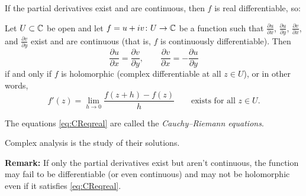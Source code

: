 \documentclass[10pt,aspectratio=169]{beamer}
\begin{document}
\begin{frame}

If the partial derivatives exist and are continuous, then $f$ is real
differentiable, so:

\pause

\begin{corollary}
Let $U \subset {\mathbb{C}}$ be open and let $f = u+iv \colon U \to {\mathbb{C}}$ be a function
such that $\frac{\partial u}{\partial x}$, $\frac{\partial u}{\partial y}$, $\frac{\partial
v}{\partial x}$, and $\frac{\partial v}{\partial y}$ exist and are continuous (that is,
$f$ is continuously differentiable).
\pause
Then
\begin{equation} \label{eq:CReqreal}
\frac{\partial u}{\partial x} = \frac{\partial v}{\partial y} , \qquad
\frac{\partial v}{\partial x} = -\frac{\partial u}{\partial y}
\end{equation}
if and only if $f$ is holomorphic (complex differentiable at all $z \in U$),
\pause
or in other words,
\begin{equation*}
f'(z) =
\lim_{h \to 0} \frac{f(z+h) - f(z)}{h}
\qquad
\text{exists for all $z \in U$.}
\end{equation*}
\end{corollary}

\pause

The equations \eqref{eq:CReqreal} are called the
\emph{Cauchy--Riemann equations}.

\medskip
\pause

Complex analysis is the study of their solutions.

\medskip
\pause

\textbf{Remark:} If only the partial derivatives exist but aren't
continuous, the function may fail to be differentiable (or even continuous)
and may not be holomorphic even if it satisfies
\eqref{eq:CReqreal}.

\end{frame}
\end{document}
